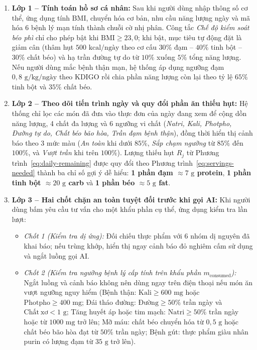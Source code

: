 \begin{enumerate}[leftmargin=0.8cm, itemsep=2.5pt, topsep=2pt]
    \item \textbf{Lớp 1 -- Tính toán hồ sơ cá nhân:} Sau khi người dùng nhập thông số cơ thể, ứng dụng tính $\mathrm{BMI}$, chuyển hóa cơ bản, nhu cầu năng lượng ngày và mã hóa 6 bệnh lý mạn tính thành chuỗi cờ nhị phân. Công tắc \textit{Chế độ kiểm soát béo phì} chỉ cho phép bật khi $\mathrm{BMI} \ge 23{,}0$; khi bật, mục tiêu tự động đặt là giảm cân (thâm hụt $500\text{ kcal/ngày}$ theo cơ cấu $30\%$ đạm -- $40\%$ tinh bột -- $30\%$ chất béo) và hạ trần đường tự do từ $10\%$ xuống $5\%$ tổng năng lượng. Nếu người dùng mắc bệnh thận mạn, hệ thống áp dụng ngưỡng đạm $0{,}8\text{ g/kg/ngày}$ theo KDIGO rồi chia phần năng lượng còn lại theo tỷ lệ $65\%$ tinh bột và $35\%$ chất béo.
    \item \textbf{Lớp 2 -- Theo dõi tiến trình ngày và quy đổi phần ăn thiếu hụt:} Hệ thống chỉ lọc các món đã đưa vào thực đơn của ngày đang xem để cộng dồn năng lượng, 4 chất đa lượng và 6 ngưỡng vi chất (\textit{Natri, Kali, Photpho, Đường tự do, Chất béo bão hòa, Trần đạm bệnh thận}), đồng thời hiển thị cảnh báo theo 3 mức màu (\textit{An toàn} khi dưới $85\%$, \textit{Sắp chạm ngưỡng} từ $85\%$ đến $100\%$, và \textit{Vượt trần} khi trên $100\%$). Lượng thiếu hụt $R_j$ từ Phương trình~\eqref{eq:daily-remaining} được quy đổi theo Phương trình~\eqref{eq:servings-needed} thành ba chỉ số gợi ý dễ hiểu: \textbf{1 phần đạm $\approx 7\text{ g}$ protein}, \textbf{1 phần tinh bột $\approx 20\text{ g}$ carb} và \textbf{1 phần béo $\approx 5\text{ g}$ fat}.
    \item \textbf{Lớp 3 -- Hai chốt chặn an toàn tuyệt đối trước khi gọi AI:} Khi người dùng bấm yêu cầu tư vấn cho một khẩu phần cụ thể, ứng dụng kiểm tra lần lượt:
    \begin{itemize}[leftmargin=0.6cm, label=--, itemsep=1.5pt, topsep=1.5pt]
        \item \textit{Chốt 1 (Kiểm tra dị ứng):} Đối chiếu thực phẩm với 6 nhóm dị nguyên đã khai báo; nếu trùng khớp, hiển thị ngay cảnh báo đỏ nghiêm cấm sử dụng và ngắt luồng gọi AI.
        \item \textit{Chốt 2 (Kiểm tra ngưỡng bệnh lý cấp tính trên khẩu phần $m_{\text{consumed}}$):} Ngắt luồng và cảnh báo không nên dùng ngay trên điện thoại nếu món ăn vượt ngưỡng nguy hiểm (Bệnh thận: $\mathrm{Kali} \ge 600\text{ mg}$ hoặc $\mathrm{Photpho} \ge 400\text{ mg}$; Đái tháo đường: $\mathrm{Đường} \ge 50\%$ trần ngày và $\mathrm{Chất\ xơ} < 1\text{ g}$; Tăng huyết áp hoặc tim mạch: $\mathrm{Natri} \ge 50\%$ trần ngày hoặc từ $1000\text{ mg}$ trở lên; Mỡ máu: chất béo chuyển hóa từ $0{,}5\text{ g}$ hoặc chất béo bão hòa đạt từ $50\%$ trần ngày; Bệnh gút: thực phẩm giàu nhân purin có lượng đạm từ $35\text{ g}$ trở lên).

\end{itemize}
\end{enumerate}
